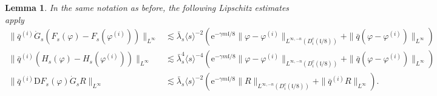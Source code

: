 \documentclass[11pt, a4paper]{scrartcl}
\numberwithin{equation}{section}
\theoremstyle{plain}
\newtheorem{lemma}[foo]{Lemma}
\theoremstyle{remark}
\newcommand{\mathD}{\mathrm{D}}
\newcommand{\mathe}{\mathrm{e}}
\newcommand{\nosymbol}{}
\begin{document}
\begin{lemma}
  \label{lem:Lip-corr}In the same notation as before, the following Lipschitz
  estimates apply
  {\footnotesize
  \begin{align}
    \| \bar{q}^{(i)}  \dot{G}_s (F_s (\varphi) - F_s (\varphi^{(i)}))
    \|_{L^{\infty}} & \lesssim  \bar{\lambda}_s \langle s \rangle^{- 2} (\mathe^{-
    \gamma m\mathfrak{l}/ 8}  \| \varphi - \varphi^{(i)} \|_{L^{\infty, - n}
    (D_i^c (\mathfrak{l}/ 8))} + \| \bar{q} (\varphi - \varphi^{(i)})
    \|_{L^{\infty}}) \label{eq:fwd-est} \\
    \| \bar{q}^{(i)} (H_s (\varphi) - H_s (\varphi^{(i)})) \|_{L^{\infty}} &
    \lesssim \bar{\lambda}^4_s \langle s \rangle^{- 4} (\mathe^{- \gamma
    m\mathfrak{l}/ 8}  \| \varphi - \varphi^{(i)} \|_{L^{\infty, - n} (D_i^c
    (\mathfrak{l}/ 8))} + \| \bar{q} (\varphi - \varphi^{(i)})
    \|_{L^{\infty}}) \label{eq:H-est} \\
    \| \bar{q}^{(i)} \mathD F_s (\varphi)  \dot{G}_s R \|_{\nosymbol
    L^{\infty}} & \lesssim  \bar{\lambda}_s \langle s \rangle^{- 2} (\mathe^{-
    \gamma m\mathfrak{l}/ 8} \| R \|_{L^{\infty, - n} (D_i^c (\mathfrak{l}/
    8))} + \| \bar{q}^{(i)} R \|_{L^{\infty}}) \label{eq:bwd-est} . 
  \end{align}}
\end{lemma}
\end{document}
